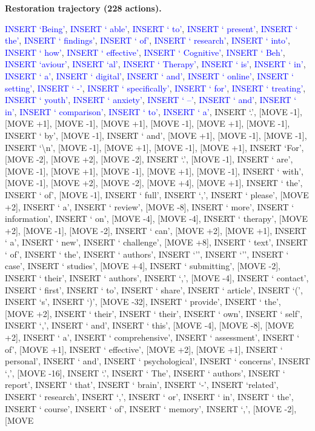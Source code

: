\documentclass[11pt]{article}
\begin{document}
\vspace{0.4em}
\textbf{Restoration trajectory (228 actions).}\par
{
\ttfamily\scriptsize\raggedright\setlength{\parindent}{0pt}
\textcolor{blue}{INSERT `Being'}, \textcolor{blue}{INSERT ` able'}, \textcolor{blue}{INSERT ` to'}, \textcolor{blue}{INSERT ` present'}, \textcolor{blue}{INSERT ` the'}, \textcolor{blue}{INSERT ` findings'}, \textcolor{blue}{INSERT ` of'}, \textcolor{blue}{INSERT ` research'}, \textcolor{blue}{INSERT ` into'}, \textcolor{blue}{INSERT ` how'}, \textcolor{blue}{INSERT ` effective'}, \textcolor{blue}{INSERT ` Cognitive'}, \textcolor{blue}{INSERT ` Beh'}, \textcolor{blue}{INSERT `aviour'}, \textcolor{blue}{INSERT `al'}, \textcolor{blue}{INSERT ` Therapy'}, \textcolor{blue}{INSERT ` is'}, \textcolor{blue}{INSERT ` in'}, \textcolor{blue}{INSERT ` a'}, \textcolor{blue}{INSERT ` digital'}, \textcolor{blue}{INSERT ` and'}, \textcolor{blue}{INSERT ` online'}, \textcolor{blue}{INSERT ` setting'}, \textcolor{blue}{INSERT ` -'}, \textcolor{blue}{INSERT ` specifically'}, \textcolor{blue}{INSERT ` for'}, \textcolor{blue}{INSERT ` treating'}, \textcolor{blue}{INSERT ` youth'}, \textcolor{blue}{INSERT ` anxiety'}, \textcolor{blue}{INSERT ` –'}, \textcolor{blue}{INSERT ` and'}, \textcolor{blue}{INSERT ` in'}, \textcolor{blue}{INSERT ` comparison'}, \textcolor{blue}{INSERT ` to'}, \textcolor{blue}{INSERT ` a'}, INSERT `.', [MOVE -1], [MOVE +1], [MOVE -1], [MOVE +1], [MOVE -1], [MOVE +1], [MOVE -1], INSERT ` by', [MOVE -1], INSERT ` and', [MOVE +1], [MOVE -1], [MOVE -1], INSERT `\textbackslash{}n', [MOVE -1], [MOVE +1], [MOVE -1], [MOVE +1], INSERT `For', [MOVE -2], [MOVE +2], [MOVE -2], INSERT `.', [MOVE -1], INSERT ` are', [MOVE -1], [MOVE +1], [MOVE -1], [MOVE +1], [MOVE -1], INSERT ` with', [MOVE -1], [MOVE +2], [MOVE -2], [MOVE +4], [MOVE +1], INSERT ` the', INSERT ` of', [MOVE -1], INSERT ` full', INSERT `,', INSERT ` please', [MOVE +2], INSERT ` a', INSERT ` review', [MOVE -8], INSERT ` more', INSERT ` information', INSERT ` on', [MOVE -4], [MOVE -4], INSERT ` therapy', [MOVE +2], [MOVE -1], [MOVE -2], INSERT ` can', [MOVE +2], [MOVE +1], INSERT ` a', INSERT ` new', INSERT ` challenge', [MOVE +8], INSERT ` text', INSERT ` of', INSERT ` the', INSERT ` authors', INSERT `'', INSERT `'', INSERT ` case', INSERT ` studies', [MOVE +4], INSERT ` submitting', [MOVE -2], INSERT ` their', INSERT ` authors', INSERT `,', [MOVE -4], INSERT ` contact', INSERT ` first', INSERT ` to', INSERT ` share', INSERT ` article', INSERT `(', INSERT `s', INSERT `)', [MOVE -32], INSERT ` provide', INSERT ` the', [MOVE +2], INSERT ` their', INSERT ` their', INSERT ` own', INSERT ` self', INSERT `,', INSERT ` and', INSERT ` this', [MOVE -4], [MOVE -8], [MOVE +2], INSERT ` a', INSERT ` comprehensive', INSERT ` assessment', INSERT ` of', [MOVE +1], INSERT ` effective', [MOVE +2], [MOVE +1], INSERT ` personal', INSERT ` and', INSERT ` psychological', INSERT ` concerns', INSERT `,', [MOVE -16], INSERT `.', INSERT ` The', INSERT ` authors', INSERT ` report', INSERT ` that', INSERT ` brain', INSERT `-', INSERT `related', INSERT ` research', INSERT `,', INSERT ` or', INSERT ` in', INSERT ` the', INSERT ` course', INSERT ` of', INSERT ` memory', INSERT `,', [MOVE -2], [MOVE }
\end{document}
